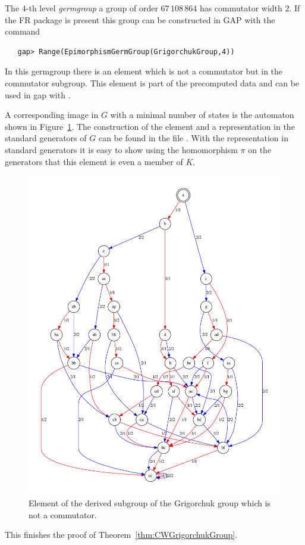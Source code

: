 \documentclass[a4paper,11pt]{amsart}
\begin{document}
The $4$-th level \emph{germgroup} 
a group of order $67\,108\,864$ has commutator width $2$.
If the FR package is present this group can be constructed in GAP with 
the command 
\begin{lstlisting}
   gap> Range(EpimorphismGermGroup(GrigorchukGroup,4))
\end{lstlisting}
In this germgroup there is an element which is not a commutator 
but in the commutator subgroup. This element is part of the
precomputed data and can be used in gap with
.	

 A corresponding image in $G$ with a minimal number of states is the automaton shown in Figure~\ref{fig:noncomm}. 
The construction of the element and a representation in the standard generators of $G$ can be found in the file
 . With the representation in standard generators it is easy to show using the 
 homomorphism $\pi$ on the generators that this element is even a member of $K$.
\begin{figure}
 \includegraphics[width=\textwidth]{gap/PCD/noncomm29states}
 \caption{Element of the derived subgroup of the Grigorchuk group which is not a commutator.}\label{fig:noncomm}
\end{figure}
This finishes the proof of Theorem~\ref{thm:CWGrigorchukGroup}.
\end{document}
